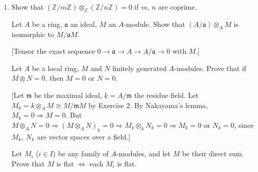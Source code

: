 \begin{enumerate}
\item Show that $(\mathbb Z/m\mathbb Z)\otimes_{\mathbb Z}(\mathbb Z/n\mathbb Z)=0$ if $m$, $n$ are coprime.

\amstaritem Let $A$ be a ring, $\mathfrak a$ an ideal, $M$ an $A$-module. Show that $(A/\mathfrak a)\otimes_A M$ is isomorphic to $M/\mathfrak aM$.

[Tensor the exact sequence $0\longrightarrow\mathfrak a\longrightarrow A\longrightarrow A/\mathfrak a\longrightarrow0$ with $M$.]

\amstaritem Let $A$ be a local ring, $M$ and $N$ finitely generated $A$-modules. Prove that if $M\otimes N=0$, then $M=0$ or $N=0$.

[Let $\mathfrak m$ be the maximal ideal, $k=A/\mathfrak m$ the residue field. Let $M_k=k\otimes_A M\cong M/\mathfrak mM$ by Exercise 2. By Nakayama's lemma, $M_k=0\Rightarrow M=0$. But $M\otimes_A N=0\Rightarrow(M\otimes_A N)_k=0\Rightarrow M_k\otimes_k N_k=0\Rightarrow M_k=0$ or $N_k=0$, since $M_k$, $N_k$ are vector spaces over a field.]

\amstaritem Let $M_i$ ($i\in I$) be any family of $A$-modules, and let $M$ be their direct sum. Prove that $M$ is flat $\Longleftrightarrow$ each $M_i$ is flat.
\end{enumerate}

